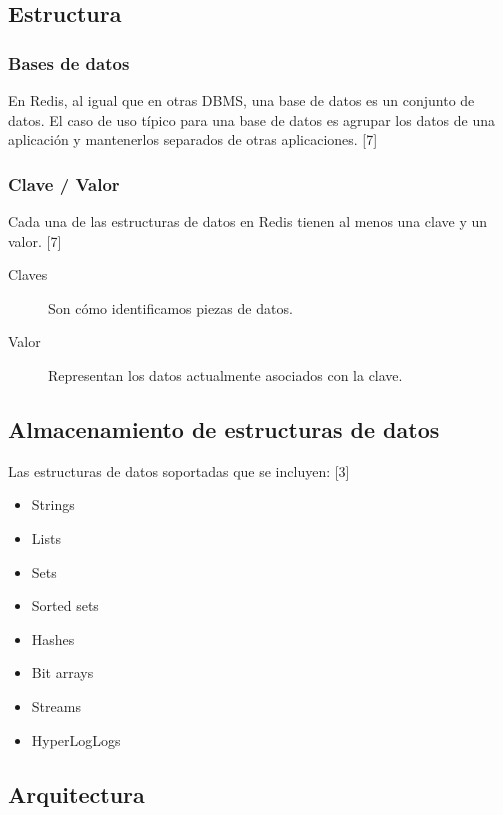 \documentclass[twocolumn]{article}
\begin{document}
\subsection{Estructura}

\subsubsection{Bases de datos}

En Redis, al igual que en otras DBMS, una base de datos es un conjunto de datos. El caso de uso típico para una base de datos es agrupar los datos de una aplicación y mantenerlos separados de otras aplicaciones. [7]

\subsubsection{Clave / Valor}

Cada una de las estructuras de datos en Redis tienen al menos una clave y un valor. [7]

\begin{description}
  \item[Claves] Son cómo identificamos piezas de datos.
  \item[Valor] Representan los datos actualmente asociados con la clave.
\end{description}

\subsection{Almacenamiento de estructuras de datos}

Las estructuras de datos soportadas que se incluyen: [3]

\begin{itemize}
  \item Strings
  \item Lists
  \item Sets
  \item Sorted sets
  \item Hashes
  \item Bit arrays
  \item Streams
  \item HyperLogLogs
\end{itemize}

\subsection{Arquitectura}
\end{document}
